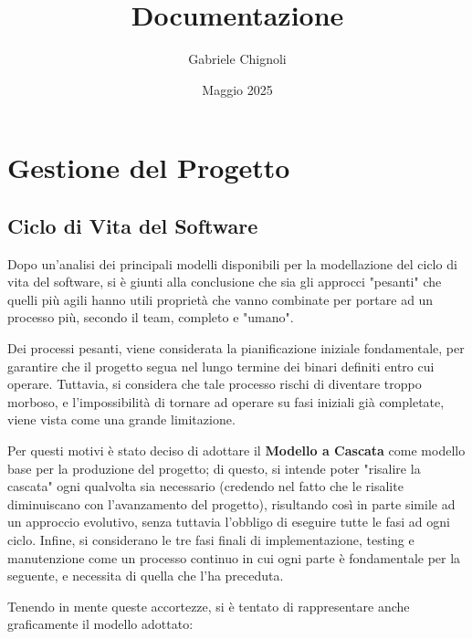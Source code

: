 \documentclass{article}
\title{\huge Documentazione}
\author{Gabriele Chignoli}
\date{Maggio 2025}
\begin{document}
\maketitle
\newpage
\tableofcontents
\newpage

\section{Gestione del Progetto}
\subsection{Ciclo di Vita del Software}
Dopo un'analisi dei principali modelli disponibili per la modellazione del ciclo di vita del software, si è giunti alla conclusione che sia gli approcci "pesanti" che quelli più agili hanno utili proprietà che vanno combinate per portare ad un processo più, secondo il team, completo e "umano".  \newline 

Dei processi pesanti, viene considerata la pianificazione iniziale fondamentale, per garantire che il progetto segua nel lungo termine dei binari definiti entro cui operare. Tuttavia, si considera che tale processo rischi di diventare troppo morboso, e l'impossibilità di tornare ad operare su fasi iniziali già completate, viene vista come una grande limitazione. 

Per questi motivi è stato deciso di adottare il \textbf{Modello a Cascata} come modello base per la produzione del progetto; di questo, si intende poter "risalire la cascata" ogni qualvolta sia necessario (credendo nel fatto che le risalite diminuiscano con l'avanzamento del progetto), risultando così in parte simile ad un approccio evolutivo, senza tuttavia l'obbligo di eseguire tutte le fasi ad ogni ciclo. Infine, si considerano le tre fasi finali di implementazione, testing e manutenzione come un processo continuo in cui ogni parte è fondamentale per la seguente, e necessita di quella che l'ha preceduta. \newline 

Tenendo in mente queste accortezze, si è tentato di rappresentare anche graficamente il modello adottato:
\end{document}
